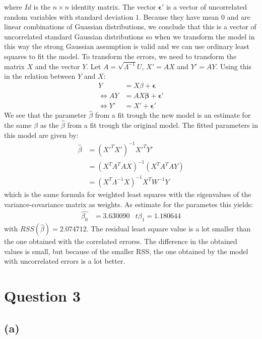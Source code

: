 \documentclass[a4paper]{article}
\begin{document}
where $Id$ is the $n\times n$ identity matrix. The vector $\mathbf{\epsilon}'$ is a vector of uncorrelated random variables with standard deviation $1$. Because they have mean $0$ and are linear combinations of Guassian distributions, we conclude that this is a vector of uncorrelated standard Gaussian distributions so when we transform the model in this way the strong Gaussian assumption is valid and we can use ordinary least squares to fit the model.
To transform the errors, we need to transform the matrix $X$ and the vector $Y$. Let $A = \sqrt{\Lambda^{-1}}U$, $X' = AX$ and $Y' = AY$. Using this in the relation between $Y$ and $X$:
\begin{align*}
	Y &= X\beta + \mathbf{\epsilon}\\
	\Leftrightarrow AY &= AX\mathbf{\beta} + \mathbf{\epsilon}'\\
	\Leftrightarrow Y' &= X' + \mathbf{\epsilon}'
\end{align*}
We see that the parameter $\hat{\beta}$ from a fit trough the new model is an estimate for the same $\beta$ as the $\hat{\beta}$ from a fit trough the original model.
The fitted parameters in this model are given by:
\begin{align*}
	\hat{\beta} &= (X'^TX')^{-1} X'^TY'\\
		    &= (X^T A^T A X)^{-1} (X^T A^T A Y)\\
		    &= (X^T \Lambda^{-1} X)^{-1} X^T W^{-1} Y
\end{align*}
which is the same formula for weighted least squares with the eigenvalues of the variance-covariance matrix as weights. As estimate for the parametes this yields:
\begin{align*}
	\hat{\beta_0} &= 3.630090 &t{\beta_1} = 1.180644
\end{align*}
with $RSS(\hat{\beta})=2.074712$. The residual least square value is a lot smaller than the one obtained with the correlated errorss. The difference in the obtained values is small, but because of the smaller RSS, the one obtained by the model with uncorrelated errors is a lot better.

\newpage
\section*{Question 3}

\subsection*{(a)}
\noindent {}
\end{document}
